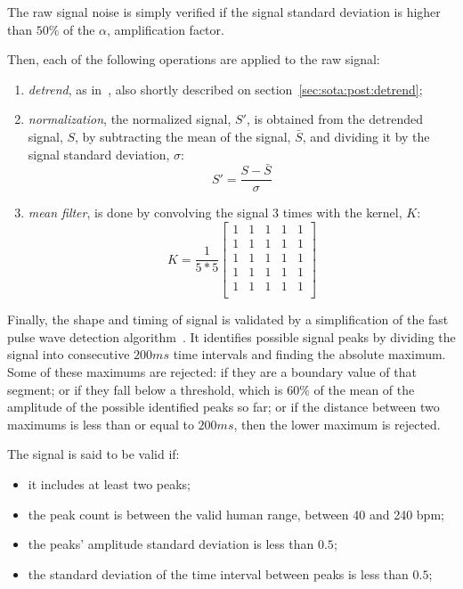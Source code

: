 The raw signal noise is simply verified if the signal standard deviation
is higher than $50\%$ of the $\alpha$, amplification factor.

Then, each of the following operations are applied to the raw signal:
\begin{enumerate}
  \item \emph{detrend}, as in~\cite{Tarvainen2002Advanced}, also shortly
        described on section~\ref{sec:sota:post:detrend};
  \item \emph{normalization}, the normalized signal, $S'$, is obtained from
        the detrended signal, $S$, by subtracting the mean of the signal,
        $\bar{S}$, and dividing it by the signal standard deviation, $\sigma$:
        \begin{equation}
          S' = \frac{S - \bar{S}}{\sigma}
        \end{equation}
  \item \emph{mean filter}, is done by convolving the signal $3$ times with
        the kernel, $K$:
        \begin{equation}
          K = \frac{1}{5 * 5}
          \begin{bmatrix}
             1 & 1 & 1 & 1 & 1 \\
             1 & 1 & 1 & 1 & 1 \\
             1 & 1 & 1 & 1 & 1 \\
             1 & 1 & 1 & 1 & 1 \\
             1 & 1 & 1 & 1 & 1 \\
          \end{bmatrix}
        \end{equation}
\end{enumerate}

Finally, the shape and timing of signal is validated by a simplification of
the fast pulse wave detection algorithm~\cite{Nenova2010Automated}.
It identifies possible signal peaks by dividing the signal into consecutive
$200 ms$ time intervals and finding the absolute maximum. Some of these maximums
are rejected: if they are a boundary value of that segment; or if they fall
below a threshold, which is $60\%$ of the mean of the amplitude of the possible
identified peaks so far; or if the distance between two maximums is less than
or equal to $200 ms$, then the lower maximum is rejected.

\pagebreak

The signal is said to be valid if:
\begin{itemize}
  \item it includes at least two peaks;
  \item the peak count is between the valid human range, between 40 and 240 bpm;
  \item the peaks' amplitude standard deviation is less than $0.5$;
  \item the standard deviation of the time interval between peaks is less
        than $0.5$;
\end{itemize}

